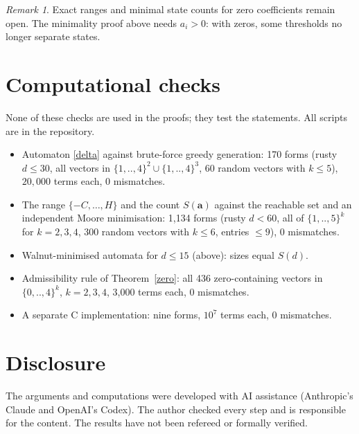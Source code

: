 \documentclass[11pt]{article}
\theoremstyle{remark}\newtheorem{remark}[theorem]{Remark}
\theoremstyle{definition}\newtheorem{definition}[theorem]{Definition}
\begin{document}
\begin{remark}
Exact ranges and minimal state counts for zero coefficients remain open. The minimality proof above needs \(a_i>0\): with zeros, some thresholds no longer separate states.
\end{remark}

\section{Computational checks}
None of these checks are used in the proofs; they test the statements. All scripts are in the repository.
\begin{itemize}
\item Automaton \eqref{delta} against brute-force greedy generation: 170 forms (rusty \(d\le30\), all vectors in \(\{1,..,4\}^2\cup\{1,..,4\}^3\), 60 random vectors with \(k\le5\)), \(20{,}000\) terms each, 0 mismatches.
\item The range \(\{-C,\dots,H\}\) and the count \(S(\mathbf a)\) against the reachable set and an independent Moore minimisation: 1{,}134 forms (rusty \(d<60\), all of \(\{1,..,5\}^k\) for \(k=2,3,4\), 300 random vectors with \(k\le6\), entries \(\le9\)), 0 mismatches.
\item Walnut-minimised automata for \(d\le15\) (above): sizes equal \(S(d)\).
\item Admissibility rule of Theorem~\ref{zero}: all 436 zero-containing vectors in \(\{0,..,4\}^k\), \(k=2,3,4\), 3{,}000 terms each, 0 mismatches.
\item A separate C implementation: nine forms, \(10^7\) terms each, 0 mismatches.
\end{itemize}

\section*{Disclosure}
The arguments and computations were developed with AI assistance (Anthropic's Claude and OpenAI's Codex). The author checked every step and is responsible for the content. The results have not been refereed or formally verified.
\end{document}
